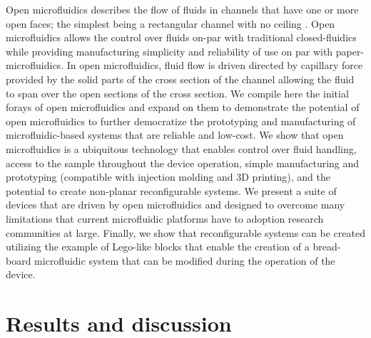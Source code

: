 Open microfluidics describes the flow of fluids in channels that have one or more open faces; the simplest being a rectangular channel with no ceiling \cite{Berthier2012, Casavant2013}. Open microfluidics allows the control over fluids on-par with traditional closed-fluidics while providing manufacturing simplicity and reliability of use on par with paper-microfluidics. In open microfluidics, fluid flow is driven directed by capillary force provided by the solid parts of the cross section of the channel allowing the fluid to span over the open sections of the cross section. We compile here the initial forays of open microfluidics and expand on them to demonstrate the potential of open microfluidics to further democratize the prototyping and manufacturing of microfluidic-based systems that are reliable and low-cost. We show that open microfluidics is a ubiquitous technology that enables control over fluid handling, access to the sample throughout the device operation, simple manufacturing and prototyping (compatible with injection molding and 3D printing), and the potential to create non-planar reconfigurable systems. We present a suite of devices that are driven by open microfluidics and designed to overcome many limitations that current microfluidic platforms have to adoption research communities at large. Finally, we show that reconfigurable systems can be created utilizing the example of Lego-like blocks that enable the creation of a bread-board microfluidic system that can be modified during the operation of the device.

\section{Results and discussion}

